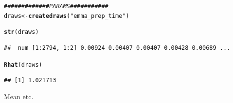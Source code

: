 \documentclass{article}\usepackage[]{graphicx}\usepackage[]{color}
\makeatletter
\newcommand{\hlstr}[1]{\textcolor[rgb]{0.192,0.494,0.8}{#1}}%
\newcommand{\hlcom}[1]{\textcolor[rgb]{0.678,0.584,0.686}{\textit{#1}}}%
\newcommand{\hlstd}[1]{\textcolor[rgb]{0.345,0.345,0.345}{#1}}%
\newcommand{\hlkwb}[1]{\textcolor[rgb]{0.69,0.353,0.396}{#1}}%
\newcommand{\hlkwd}[1]{\textcolor[rgb]{0.737,0.353,0.396}{\textbf{#1}}}%
\newenvironment{kframe}{%
 \def\at@end@of@kframe{}%
 \ifinner\ifhmode%
  \def\at@end@of@kframe{\end{minipage}}%
  \begin{minipage}{\columnwidth}%
 \fi\fi%
 \def\FrameCommand##1{\hskip\@totalleftmargin \hskip-\fboxsep
 \colorbox{shadecolor}{##1}\hskip-\fboxsep
     \hskip-\linewidth \hskip-\@totalleftmargin \hskip\columnwidth}%
 \MakeFramed {\advance\hsize-\width
   \@totalleftmargin\z@ \linewidth\hsize
   \@setminipage}}%
 {\par\unskip\endMakeFramed%
 \at@end@of@kframe}
\newenvironment{knitrout}{}{} %
\makeatother
\begin{document}
\begin{knitrout}
\color{fgcolor}\begin{kframe}
\begin{alltt}
\hlcom{############# PARAMS###########}
\hlstd{draws} \hlkwb{<-} \hlkwd{createdraws}\hlstd{(}\hlstr{"emma_prep_time"}\hlstd{)}

\hlkwd{str}\hlstd{(draws)}
\end{alltt}
\begin{verbatim}
##  num [1:2794, 1:2] 0.00924 0.00407 0.00407 0.00428 0.00689 ...
\end{verbatim}
\begin{alltt}
\hlkwd{Rhat}\hlstd{(draws)}
\end{alltt}
\begin{verbatim}
## [1] 1.021713
\end{verbatim}
\end{kframe}
\end{knitrout}

Mean etc.
\end{document}
